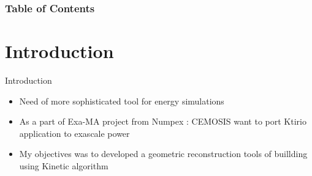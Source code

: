 \documentclass[10pt]{beamer}
\begin{document}
\begin{frame}
    \frametitle{Table of Contents}
    \begin{multicols}{2} %
        \tableofcontents
    \end{multicols}
    \end{frame}


\section{Introduction}
\begin{frame}{Introduction}
  \begin{itemize}
    \item Need of more sophisticated tool for energy simulations
    \item As a part of Exa-MA project from Numpex : CEMOSIS want to port Ktirio application to exascale power 
    \item My objectives was to developed a geometric reconstruction tools of buillding using Kinetic algorithm
  \end{itemize}

\end{frame}
\end{document}

